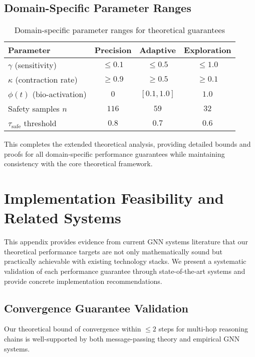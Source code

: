 \documentclass{article}
\begin{document}
\subsection{Domain-Specific Parameter Ranges}

\begin{table}[h]
\centering
\begin{tabular}{|l|c|c|c|}
\hline
\textbf{Parameter} & \textbf{Precision} & \textbf{Adaptive} & \textbf{Exploration} \\
\hline
$\gamma$ (sensitivity) & $\leq 0.1$ & $\leq 0.5$ & $\leq 1.0$ \\
$\kappa$ (contraction rate) & $\geq 0.9$ & $\geq 0.5$ & $\geq 0.1$ \\
$\phi(t)$ (bio-activation) & $0$ & $[0.1, 1.0]$ & $1.0$ \\
Safety samples $n$ & $116$ & $59$ & $32$ \\
$\tau_{\text{safe}}$ threshold & $0.8$ & $0.7$ & $0.6$ \\
\hline
\end{tabular}
\caption{Domain-specific parameter ranges for theoretical guarantees}
\end{table}

This completes the extended theoretical analysis, providing detailed bounds and proofs for all domain-specific performance guarantees while maintaining consistency with the core theoretical framework.

\section{Implementation Feasibility and Related Systems}
\label{app:feasibility}

This appendix provides evidence from current GNN systems literature that our theoretical performance targets are not only mathematically sound but practically achievable with existing technology stacks. We present a systematic validation of each performance guarantee through state-of-the-art systems and provide concrete implementation recommendations.

\subsection{Convergence Guarantee Validation}

Our theoretical bound of convergence within $\leq 2$ steps for multi-hop reasoning chains is well-supported by both message-passing theory and empirical GNN systems.
\end{document}
